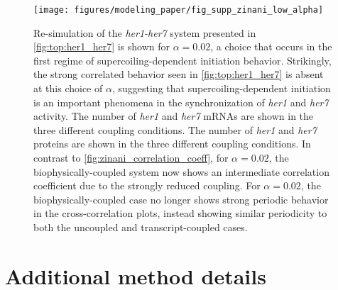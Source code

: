 \documentclass[11pt]{article}
\begin{document}
\begin{figure}[hbtp]
    \centering
    {\texttt{[image: figures/modeling\_paper/fig\_supp\_zinani\_low\_alpha]}
    \label{fig:supp:zinani_alpha_mRNA}
    \label{fig:supp:zinani_alpha_protein}
    \label{fig:supp:zinani_alpha_correlation}
    \label{fig:supp:zinani_alpha_cross_correlation}
    }
    \caption{Re-simulation of the \textit{her1-her7} system presented in \cref{fig:top:her1_her7} is shown for \(\alpha = 0.02\), a choice that occurs in the first regime of supercoiling-dependent initiation behavior. Strikingly, the strong correlated behavior seen in \cref{fig:top:her1_her7} is absent at this choice of \(\alpha\), suggesting that supercoiling-dependent initiation is an important phenomena in the synchronization of \textit{her1} and \textit{her7} activity.
     The number of \textit{her1} and \textit{her7} mRNAs are shown in the three different coupling conditions.
     The number of \textit{her1} and \textit{her7} proteins are shown in the three  different coupling conditions.
     In contrast to \cref{fig:zinani_correlation_coeff}, for \(\alpha = 0.02\), the biophysically-coupled system now shows an intermediate correlation coefficient due to the strongly reduced coupling.
     For \(\alpha = 0.02\), the biophysically-coupled case no longer shows strong periodic behavior in the cross-correlation plots, instead showing similar periodicity to both the uncoupled and transcript-coupled cases.
    }
    \label{fig:top:supp_zinani_alpha}
\end{figure}

\FloatBarrier

\section{Additional method details}
\end{document}
